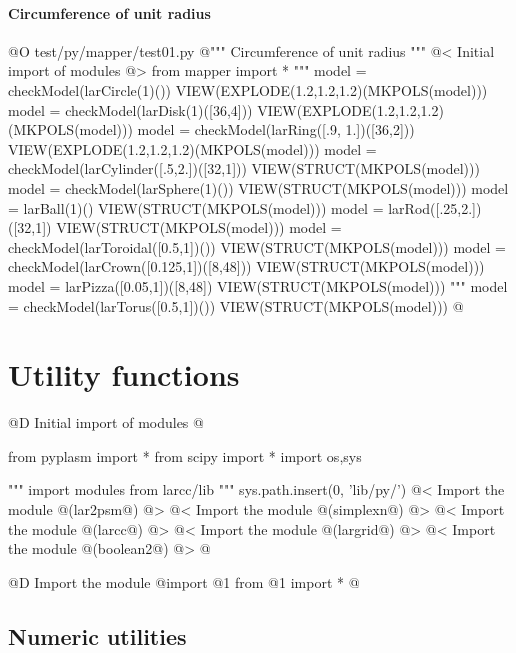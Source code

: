 \documentclass[11pt,oneside]{article}	%
\begin{document}
\paragraph{Circumference of unit radius}

@O test/py/mapper/test01.py
@{""" Circumference of unit radius """
@< Initial import of modules @>
from mapper import *
"""
model = checkModel(larCircle(1)())
VIEW(EXPLODE(1.2,1.2,1.2)(MKPOLS(model)))
model = checkModel(larDisk(1)([36,4]))
VIEW(EXPLODE(1.2,1.2,1.2)(MKPOLS(model)))
model = checkModel(larRing([.9, 1.])([36,2]))
VIEW(EXPLODE(1.2,1.2,1.2)(MKPOLS(model)))
model = checkModel(larCylinder([.5,2.])([32,1]))
VIEW(STRUCT(MKPOLS(model)))
model = checkModel(larSphere(1)())
VIEW(STRUCT(MKPOLS(model)))
model = larBall(1)()
VIEW(STRUCT(MKPOLS(model)))
model = larRod([.25,2.])([32,1])
VIEW(STRUCT(MKPOLS(model)))
model = checkModel(larToroidal([0.5,1])())
VIEW(STRUCT(MKPOLS(model)))
model = checkModel(larCrown([0.125,1])([8,48]))
VIEW(STRUCT(MKPOLS(model)))
model = larPizza([0.05,1])([8,48])
VIEW(STRUCT(MKPOLS(model)))
"""
model = checkModel(larTorus([0.5,1])())
VIEW(STRUCT(MKPOLS(model)))
@}


\appendix
\section{Utility functions}

@D Initial import of modules
@{from pyplasm import *
from scipy import *
import os,sys

""" import modules from larcc/lib """
sys.path.insert(0, 'lib/py/')
@< Import the module @(lar2psm@) @>
@< Import the module @(simplexn@) @>
@< Import the module @(larcc@) @>
@< Import the module @(largrid@) @>
@< Import the module @(boolean2@) @>
@}

@D Import the module
@{import @1
from @1 import *
@}


\subsection{Numeric utilities}
\end{document}
